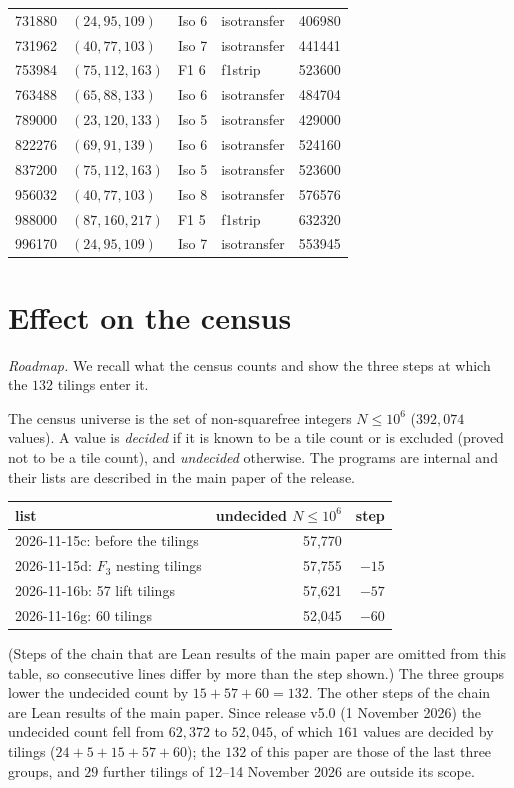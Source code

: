 \documentclass[11pt,reqno]{amsart}
\theoremstyle{plain}
\theoremstyle{definition}
\begin{document}
\begin{longtable}{rllll}
731880 & $(24,95,109)$ & Iso 6 & isotransfer & 406980 \\
731962 & $(40,77,103)$ & Iso 7 & isotransfer & 441441 \\
753984 & $(75,112,163)$ & F1 6 & f1strip & 523600 \\
763488 & $(65,88,133)$ & Iso 6 & isotransfer & 484704 \\
789000 & $(23,120,133)$ & Iso 5 & isotransfer & 429000 \\
822276 & $(69,91,139)$ & Iso 6 & isotransfer & 524160 \\
837200 & $(75,112,163)$ & Iso 5 & isotransfer & 523600 \\
956032 & $(40,77,103)$ & Iso 8 & isotransfer & 576576 \\
988000 & $(87,160,217)$ & F1 5 & f1strip & 632320 \\
996170 & $(24,95,109)$ & Iso 7 & isotransfer & 553945 \\
\hline
\end{longtable}

\section{Effect on the census}\label{sec:comp:census}
\emph{Roadmap.} We recall what the census counts and show the three steps at which the $132$ tilings enter it.

The census universe is the set of non-squarefree integers $N\le10^6$ ($392{,}074$ values). A value is \emph{decided} if it is
known to be a tile count or is excluded (proved not to be a tile count), and \emph{undecided} otherwise. The programs
are internal and their lists are described in the main paper of the release.
\begin{center}
\begin{tabular}{lrr}
\hline
list & undecided $N\le10^6$ & step\\\hline
2026-11-15c: before the tilings & 57,770 & \\
2026-11-15d: $F_3$ nesting tilings & 57,755 & $-15$\\
2026-11-16b: 57 lift tilings & 57,621 & $-57$\\
2026-11-16g: 60 tilings & 52,045 & $-60$\\\hline
\end{tabular}
\end{center}
(Steps of the chain that are Lean results of the main paper are omitted from this table, so consecutive lines differ by more than the step shown.)
The three groups lower the undecided count by $15+57+60=132$. The other steps of the chain are Lean results of the main
paper. Since release v5.0 (1 November 2026) the undecided count fell from $62{,}372$ to $52{,}045$, of which
$161$ values are decided by tilings ($24+5+15+57+60$); the $132$ of this paper are those of the last three groups, and $29$
further tilings of 12--14 November 2026 are outside its scope.
\end{document}
